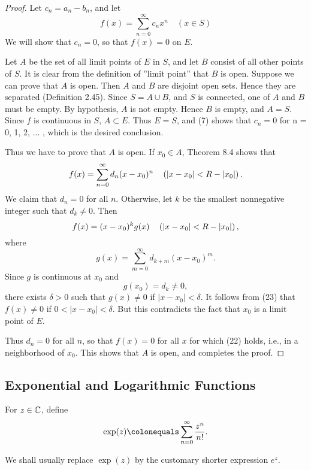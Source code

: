 \begin{proof}
Let $c_n=a_n-b_n$, and let
\[f(x)=\sum_{n=0}^{\infty}c_n x^n\quad(x\in S)\]
We will show that $c_n=0$, so that $f(x)=0$ on $E$.

Let $A$ be the set of all limit points of $E$ in $S$, and let $B$ consist of all other points of $S$. It is clear from the definition of ''limit point'' that $B$ is open. Suppose we can prove that $A$ is open. Then $A$ and $B$ are disjoint
open sets. Hence they are separated (Definition 2.45). Since $S=A\cup B$,
and $S$ is connected, one of $A$ and $B$ must be empty. By hypothesis, $A$ is
not empty. Hence $B$ is empty, and $A=S$. Since $f$ is continuous in $S$,
$A\subset E$. Thus $E=S$, and (7) shows that $c_n=0$ for n = 0, 1, 2, ... , which is the desired conclusion. 

Thus we have to prove that $A$ is open. If $x_0\in A$, Theorem 8.4 shows that
\[f(x)=\sum_{n=0}^{\infty}d_n(x-x_0)^n\quad\left(|x-x_0|<R-|x_0|\right).\]
We claim that $d_n=0$ for all $n$. Otherwise, let $k$ be the smallest nonnegative integer such that $d_k\neq0$. Then
\[f(x)=(x-x_0)^k g(x)\quad\left(|x-x_0|<R-|x_0|\right),\]
where
\[g(x)=\sum_{m=0}^{\infty}d_{k+m}(x-x_0)^m.\]
Since $g$ is continuous at $x_0$ and
\[g(x_0)=d_k\neq0,\]
there exists $\delta>0$ such that $g(x)\neq0$ if $|x-x_0|<\delta$. It follows from (23) that $f(x)\neq0$ if $0<|x-x_0|<\delta$. But this contradicts the fact that $x_0$ is a limit point of $E$.

Thus $d_n=0$ for all $n$, so that $f(x)=0$ for all $x$ for which (22) holds, i.e., in a neighborhood of $x_0$. This shows that $A$ is open, and completes the proof. 

\end{proof}
\pagebreak

\subsection{Exponential and Logarithmic Functions}
\begin{definition}
For $z\in\mathbb C$, define
\begin{equation}\label{eqn:exponential-function}
\exp(z)\colonequals\sum_{n=0}^\infty\frac{z^n}{n!}.
\end{equation}
\end{definition}

\begin{notation}
We shall usually replace $\exp(z)$ by the customary shorter expression $e^z$.
\end{notation}

